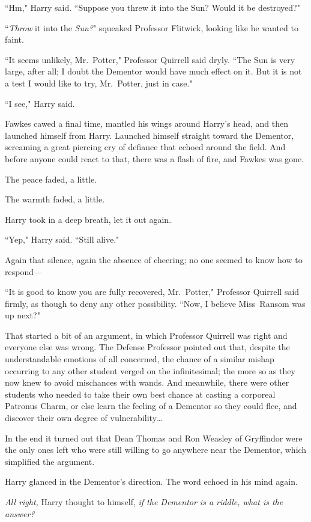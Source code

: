 ``Hm," Harry said. ``Suppose you threw it into the Sun? Would it be destroyed?"

``\emph{Throw} it into the \emph{Sun?}" squeaked Professor Flitwick, looking like he wanted to faint.

``It seems unlikely, Mr.~Potter," Professor Quirrell said dryly. ``The Sun is very large, after all; I doubt the Dementor would have much effect on it. But it is not a test I would like to try, Mr.~Potter, just in case."

``I see," Harry said.

Fawkes cawed a final time, mantled his wings around Harry's head, and then launched himself from Harry. Launched himself straight toward the Dementor, screaming a great piercing cry of defiance that echoed around the field. And before anyone could react to that, there was a flash of fire, and Fawkes was gone.

The peace faded, a little.

The warmth faded, a little.

Harry took in a deep breath, let it out again.

``Yep," Harry said. ``Still alive."

Again that silence, again the absence of cheering; no one seemed to know how to respond—

``It is good to know you are fully recovered, Mr.~Potter," Professor Quirrell said firmly, as though to deny any other possibility. ``Now, I believe Miss~Ransom was up next?"

That started a bit of an argument, in which Professor Quirrell was right and everyone else was wrong. The Defense Professor pointed out that, despite the understandable emotions of all concerned, the chance of a similar mishap occurring to any other student verged on the infinitesimal; the more so as they now knew to avoid mischances with wands. And meanwhile, there were other students who needed to take their own best chance at casting a corporeal Patronus Charm, or else learn the feeling of a Dementor so they could flee, and discover their own degree of vulnerability{\ldots}

In the end it turned out that Dean Thomas and Ron Weasley of Gryffindor were the only ones left who were still willing to go anywhere near the Dementor, which simplified the argument.

Harry glanced in the Dementor's direction. The word echoed in his mind again.

\emph{All right,} Harry thought to himself, \emph{if the Dementor is a riddle, what is the answer?}


